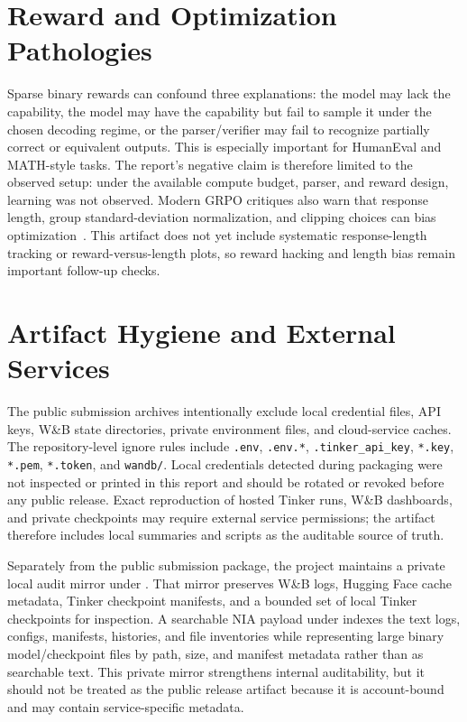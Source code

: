 \documentclass[12pt,a4paper]{report}
\begin{document}
\section*{Reward and Optimization Pathologies}
Sparse binary rewards can confound three explanations: the model may lack the capability, the model may have the capability but fail to sample it under the chosen decoding regime, or the parser/verifier may fail to recognize partially correct or equivalent outputs. This is especially important for HumanEval and MATH-style tasks. The report's negative claim is therefore limited to the observed setup: under the available compute budget, parser, and reward design, learning was not observed. Modern GRPO critiques also warn that response length, group standard-deviation normalization, and clipping choices can bias optimization~\citep{liu2025r1zerocritical}. This artifact does not yet include systematic response-length tracking or reward-versus-length plots, so reward hacking and length bias remain important follow-up checks.

\section*{Artifact Hygiene and External Services}
The public submission archives intentionally exclude local credential files, API keys, W\&B state directories, private environment files, and cloud-service caches. The repository-level ignore rules include \texttt{.env}, \texttt{.env.*}, \texttt{.tinker\_api\_key}, \texttt{*.key}, \texttt{*.pem}, \texttt{*.token}, and \texttt{wandb/}. Local credentials detected during packaging were not inspected or printed in this report and should be rotated or revoked before any public release. Exact reproduction of hosted Tinker runs, W\&B dashboards, and private checkpoints may require external service permissions; the artifact therefore includes local summaries and scripts as the auditable source of truth.

Separately from the public submission package, the project maintains a private local audit mirror under . That mirror preserves W\&B logs, Hugging Face cache metadata, Tinker checkpoint manifests, and a bounded set of local Tinker checkpoints for inspection. A searchable NIA payload under  indexes the text logs, configs, manifests, histories, and file inventories while representing large binary model/checkpoint files by path, size, and manifest metadata rather than as searchable text. This private mirror strengthens internal auditability, but it should not be treated as the public release artifact because it is account-bound and may contain service-specific metadata.
\end{document}
